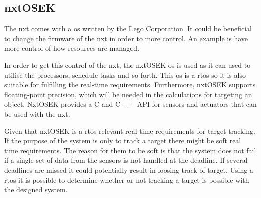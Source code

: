 \subsection{nxtOSEK}
The \gls{nxt} comes with a \gls{os} written by the Lego Corporation. It could be beneficial to change the firmware of the \gls{nxt} in order to more control. An example is have more control of how resources are managed.

In order to get this control of the \gls{nxt}, the nxtOSEK \gls{os} is used as it can used to utilise the processors, schedule tasks and so forth. This \gls{os} is a \gls{rtos} so it is also suitable for fulfilling the real-time requirements. Furthermore, nxtOSEK supports floating-point precision, which will be needed in the calculations for targeting an object. NxtOSEK provides a C and C$++$ API for sensors and actuators that can be used with the \gls{nxt}.

Given that nxtOSEK is a \gls{rtos} relevant real time requirements for target tracking. If the purpose of the system is only to track a target there might be soft real time requirements. The reason for them to be soft is that the system does not fail if a single set of data from the sensors is not handled at the deadline. If several deadlines are missed it could potentially result in loosing track of target. Using a \gls{rtos} it is possible to determine whether or not tracking a target is possible with the designed system.